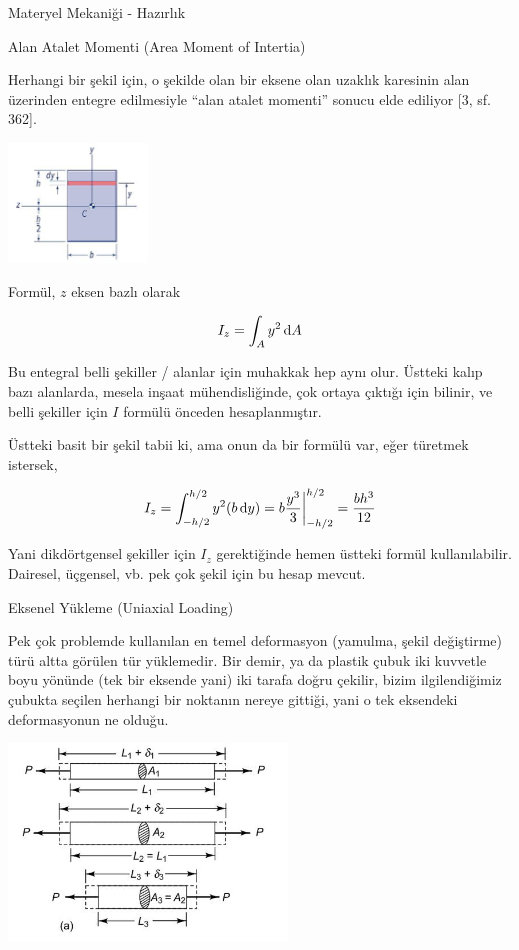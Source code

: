 \documentclass[12pt,fleqn]{article}\usepackage{../../common}
\begin{document}
Materyel Mekaniği - Hazırlık

Alan Atalet Momenti (Area Moment of Intertia)

Herhangi bir şekil için, o şekilde olan bir eksene olan uzaklık karesinin alan
üzerinden entegre edilmesiyle ``alan atalet momenti'' sonucu elde ediliyor
[3, sf. 362]. 

\includegraphics[width=10em]{phy_020_strs_00_04.jpg}

Formül, $z$ eksen bazlı olarak

$$
I_z = \int_A y^2 \,\mathrm{d} A
$$

Bu entegral belli şekiller / alanlar için muhakkak hep aynı olur. Üstteki kalıp
bazı alanlarda, mesela inşaat mühendisliğinde, çok ortaya çıktığı için
bilinir, ve belli şekiller için $I$ formülü önceden hesaplanmıştır.

Üstteki basit bir şekil tabii ki, ama onun da bir formülü var, eğer türetmek
istersek,

$$
I_z = \int_{-h/2}^{h/2} y^2 (b \,\mathrm{d} y) = b \frac{y^3}{3} \bigg\vert_{-h/2}^{h/2} =
\frac{b h^3}{12}
$$

Yani dikdörtgensel şekiller için $I_z$ gerektiğinde hemen üstteki formül
kullanılabilir. Dairesel, üçgensel, vb. pek çok şekil için bu hesap mevcut.

Eksenel Yükleme (Uniaxial Loading)

Pek çok problemde kullanılan en temel deformasyon (yamulma, şekil değiştirme)
türü altta görülen tür yüklemedir. Bir demir, ya da plastik çubuk iki kuvvetle
boyu yönünde (tek bir eksende yani) iki tarafa doğru çekilir, bizim
ilgilendiğimiz çubukta seçilen herhangi bir noktanın nereye gittiği, yani o tek
eksendeki deformasyonun ne olduğu.

\includegraphics[width=20em]{phy_020_strs_00_01.jpg}
\end{document}
